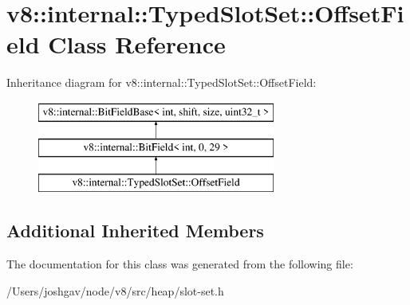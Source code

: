 \hypertarget{classv8_1_1internal_1_1_typed_slot_set_1_1_offset_field}{}\section{v8\+:\+:internal\+:\+:Typed\+Slot\+Set\+:\+:Offset\+Field Class Reference}
\label{classv8_1_1internal_1_1_typed_slot_set_1_1_offset_field}
Inheritance diagram for v8\+:\+:internal\+:\+:Typed\+Slot\+Set\+:\+:Offset\+Field\+:\begin{figure}[H]
\begin{center}
\leavevmode
\includegraphics[height=3.000000cm]{classv8_1_1internal_1_1_typed_slot_set_1_1_offset_field}
\end{center}
\end{figure}
\subsection*{Additional Inherited Members}


The documentation for this class was generated from the following file\+:\begin{DoxyCompactItemize}
\item 
/\+Users/joshgav/node/v8/src/heap/slot-\/set.\+h\end{DoxyCompactItemize}

